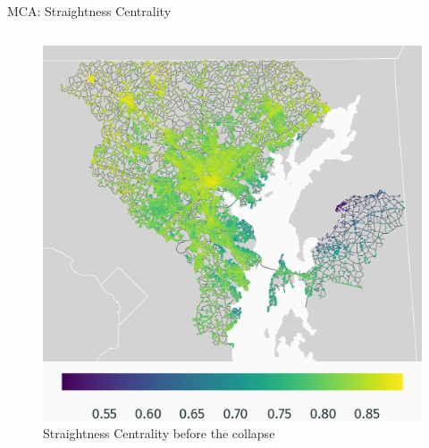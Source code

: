 \documentclass{beamer}
\numberwithin{figure}{section} %
\numberwithin{table}{section} %
\begin{document}
\begin{frame}{MCA: Straightness Centrality}
    \begin{columns}
        \begin{column}{0.33\textwidth}
            \begin{figure}
                \centering
                \includegraphics[width=\textwidth]{maps/straightness_w_bridge.png}
                {\scriptsize Straightness Centrality before the collapse}
            \end{figure}
        \end{column}


\end{columns}
\end{frame}
\end{document}
